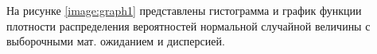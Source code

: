 На рисунке \ref{image:graph1} представлены гистограмма и график функции плотности распределения вероятностей нормальной случайной величины с выборочными мат. ожиданием и дисперсией.
\begin{figure}[H]
\end{figure}

